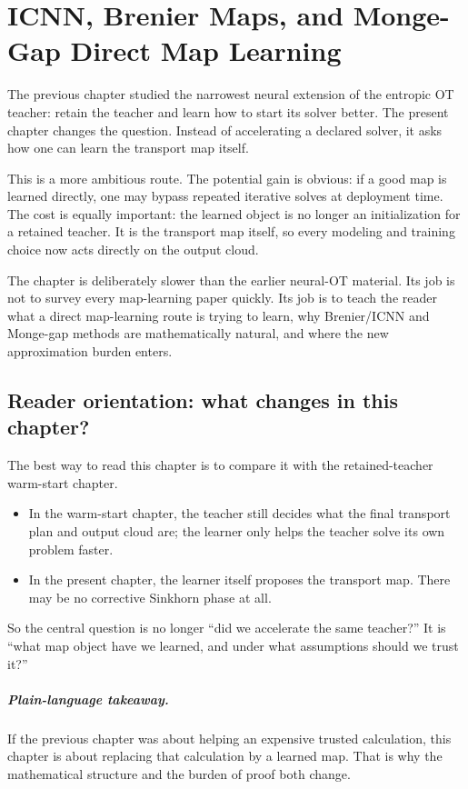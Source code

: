 \chapter{ICNN, Brenier Maps, and Monge-Gap Direct Map Learning}
\label{ch:bf-neural-ot-direct-map}

The previous chapter studied the narrowest neural extension of the entropic OT
teacher: retain the teacher and learn how to start its solver better.  The present
chapter changes the question.  Instead of accelerating a declared solver, it asks
how one can learn the transport map itself.

This is a more ambitious route.  The potential gain is obvious: if a good map is
learned directly, one may bypass repeated iterative solves at deployment time.
The cost is equally important: the learned object is no longer an initialization
for a retained teacher.  It is the transport map itself, so every modeling and
training choice now acts directly on the output cloud.

The chapter is deliberately slower than the earlier neural-OT material.  Its job
is not to survey every map-learning paper quickly.  Its job is to teach the
reader what a direct map-learning route is trying to learn, why Brenier/ICNN and
Monge-gap methods are mathematically natural, and where the new approximation
burden enters.

\section{Reader orientation: what changes in this chapter?}
\label{sec:bf-neural-ot-direct-orientation}

The best way to read this chapter is to compare it with the retained-teacher
warm-start chapter.
\begin{itemize}
  \item In the warm-start chapter, the teacher still decides what the final
  transport plan and output cloud are; the learner only helps the teacher solve
  its own problem faster.
  \item In the present chapter, the learner itself proposes the transport map.
  There may be no corrective Sinkhorn phase at all.
\end{itemize}
So the central question is no longer “did we accelerate the same teacher?”  It is
“what map object have we learned, and under what assumptions should we trust it?”

\paragraph{Plain-language takeaway.}
If the previous chapter was about helping an expensive trusted calculation, this
chapter is about replacing that calculation by a learned map.  That is why the
mathematical structure and the burden of proof both change.

